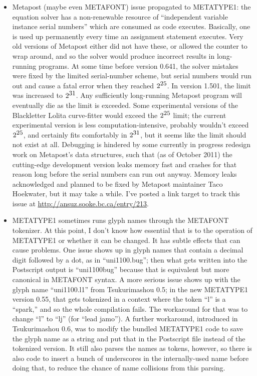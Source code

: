 \documentclass[14pt]{extarticle}
\begin{document}
\begin{itemize}
  \item Metapost (maybe even METAFONT) issue propagated to METATYPE1:
    the equation solver has a non-renewable resource of ``independent
    variable instance serial numbers'' which are consumed as code executes. 
    Basically, one is used up permanently every time an assignment statement
    executes.  Very old versions of Metapost either did not have these, or
    allowed the counter to wrap around, and so the solver would produce
    incorrect results in long-running programs.  At some time before
    version 0.641, the solver
    mistakes were fixed by the limited serial-number scheme, but
    serial numbers would run out and cause a fatal error when they reached
    $\textrm{2}^\textrm{\small 25}$.  In version 1.501, the limit was
    increased to $\textrm{2}^\textrm{\small 31}$.  Any sufficiently
    long-running Metapost program will eventually die as the limit is
    exceeded.  Some experimental versions of the Blackletter Lolita
    curve-fitter would exceed the $\textrm{2}^\textrm{\small 25}$ limit; the
    current experimental version is less computation-intensive, probably
    wouldn't exceed $\textrm{2}^\textrm{\small 25}$, and certainly fits
    comfortably in $\textrm{2}^\textrm{\small 31}$, but it seems like the
    limit should not exist at all.  Debugging is hindered by some currently
    in progress redesign work on Metapost's data structures, such that (as
    of October 2011) the cutting-edge development version leaks memory fast
    and crashes for that reason long before the serial numbers can run out
    anyway.  Memory leaks acknowledged and planned to be fixed by Metapost
    maintainer Taco Hoekwater, but it may take a while.  I've posted a link
    target to track this issue at \url{http://ansuz.sooke.bc.ca/entry/213}.

  \item METATYPE1 sometimes runs glyph names through the METAFONT
    tokenizer.  At this point, I don't know how essential that is to
    the operation of METATYPE1 or whether it can be changed.  It has
    subtle effects that can cause problems.  One issue shows up in
    glyph names that contain a decimal digit followed by a dot, as in
    ``uni1100.bug''; then what gets written into the Postscript output
    is ``uni1100bug'' because that is equivalent but more canonical in
    METAFONT syntax.  A more serious issue shows up with the glyph name
    ``uni1100.l1'' from Tsukurimashou 0.5; in the new METATYPE1 version
    0.55, that gets tokenized in a context where the token ``l'' is a
    ``spark,'' and so the whole compilation fails.  The workaround
    for that was to change ``l'' to ``lj'' (for ``lead jamo'').  A further
    workaround, introduced in Tsukurimashou 0.6, was to modify the bundled
    METATYPE1 code to save the glyph name as a string and put that in the
    Postscript file instead of the tokenized version.  It still also parses
    the names as tokens, however, so there is also code to insert a bunch of
    underscores in the internally-used name before doing that, to reduce the
    chance of name collisions from this parsing.


\end{itemize}
\end{document}
